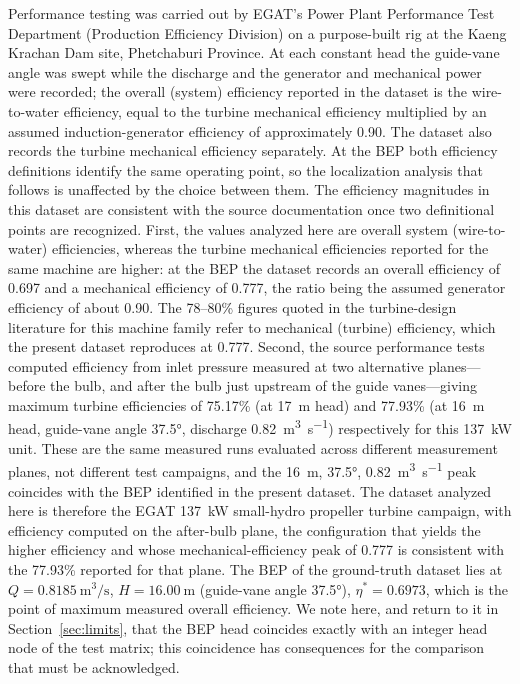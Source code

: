 \documentclass[preprint,12pt]{elsarticle}
\begin{document}
Performance testing was carried out by EGAT's Power Plant Performance Test Department
(Production Efficiency Division) on a purpose-built rig at the Kaeng Krachan Dam site,
Phetchaburi Province. At each constant head the guide-vane angle was swept while the
discharge and the generator and mechanical power were recorded; the overall (system)
efficiency reported in the dataset is the wire-to-water efficiency, equal to the
turbine mechanical efficiency multiplied by an assumed induction-generator efficiency
of approximately 0.90. The dataset also records the turbine mechanical efficiency
separately. At the BEP both efficiency definitions identify the same operating point,
so the localization analysis that follows is unaffected by the choice between them.
The efficiency magnitudes in this dataset are consistent with the source documentation
once two definitional points are recognized. First, the values analyzed here are
overall system (wire-to-water) efficiencies, whereas the turbine mechanical
efficiencies reported for the same machine are higher: at the BEP the dataset records
an overall efficiency of 0.697 and a mechanical efficiency of 0.777, the ratio being
the assumed generator efficiency of about 0.90. The 78--80\% figures quoted in the
turbine-design literature for this machine family refer to mechanical (turbine)
efficiency, which the present dataset reproduces at 0.777. Second, the source
performance tests computed efficiency from inlet pressure measured at two alternative
planes---before the bulb, and after the bulb just upstream of the guide vanes---giving
maximum turbine efficiencies of 75.17\% (at \SI{17}{\metre} head) and 77.93\% (at
\SI{16}{\metre} head, guide-vane angle \ang{37.5}, discharge
\SI{0.82}{\cubic\metre\per\second}) respectively for this \SI{137}{\kilo\watt} unit.
These are the same measured runs evaluated across different measurement planes, not
different test campaigns, and the \SI{16}{\metre}, \ang{37.5},
\SI{0.82}{\cubic\metre\per\second} peak coincides with the BEP identified in the
present dataset. The dataset analyzed here is therefore the EGAT \SI{137}{\kilo\watt}
small-hydro propeller turbine campaign, with efficiency computed on the after-bulb
plane, the configuration that yields the higher efficiency and whose
mechanical-efficiency peak of 0.777 is consistent with the 77.93\% reported for that
plane. The BEP of the ground-truth dataset lies at
$Q = \SI{0.8185}{\cubic\metre\per\second}$, $H = \SI{16.00}{\metre}$ (guide-vane
angle \ang{37.5}), $\eta^\ast = 0.6973$, which is the point of maximum measured
overall efficiency. We note here, and return to it in Section~\ref{sec:limits}, that
the BEP head coincides exactly with an integer head node of the test matrix; this
coincidence has consequences for the comparison that must be acknowledged.
\end{document}
